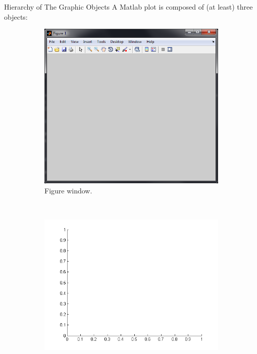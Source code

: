 \documentclass[compress]{beamer}  %
\begin{document}
\begin{frame}{Hierarchy of The Graphic Objects}
A Matlab plot is composed of (at least) three objects:
\setcounter{subfigure}{0}
\begin{figure}
        \begin{subfigure}[b]{0.3\textwidth}
                \centering
                \includegraphics[width=\textwidth]{figure_window.png}
                \caption{Figure window.}
        \end{subfigure}%
        ~\pause
        \begin{subfigure}[b]{0.3\textwidth}
                \centering
                \includegraphics[width=\textwidth]{empty_axis.png}

\end{subfigure}
\end{figure}
\end{frame}
\end{document}
